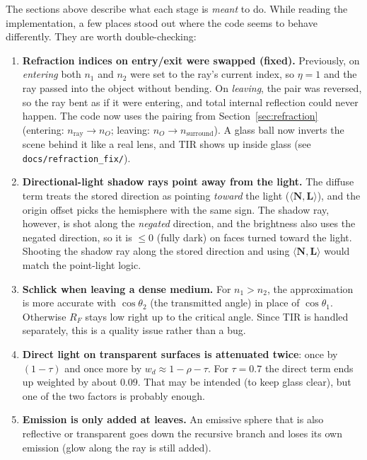 \documentclass[11pt,a4paper]{article}
\newcommand{\vv}[1]{\mathbf{#1}}
\newcommand{\dotp}[2]{\langle #1, #2\rangle}
\begin{document}
The sections above describe what each stage is \emph{meant} to do. While reading
the implementation, a few places stood out where the code seems to behave
differently. They are worth double-checking:

\begin{enumerate}[leftmargin=1.6em]
  \item \textbf{Refraction indices on entry/exit were swapped (fixed).}
        Previously, on \emph{entering} both $n_1$ and $n_2$ were set to the
        ray's current index, so $\eta=1$ and the ray passed into the object
        without bending. On \emph{leaving}, the pair was reversed, so the ray
        bent as if it were entering, and total internal reflection could never
        happen. The code now uses the pairing from Section~\ref{sec:refraction}
        (entering: $n_{\text{ray}}\to n_O$; leaving: $n_O\to n_{\text{surround}}$).
        A glass ball now inverts the scene behind it like a real lens, and TIR
        shows up inside glass (see \texttt{docs/refraction\_fix/}).
  \item \textbf{Directional-light shadow rays point away from the light.} The
        diffuse term treats the stored direction as pointing \emph{toward} the
        light ($\dotp{\vv N}{\vv L}$), and the origin offset picks the hemisphere
        with the same sign. The shadow ray, however, is shot along the
        \emph{negated} direction, and the brightness also uses the negated
        direction, so it is $\le 0$ (fully dark) on faces turned toward the
        light. Shooting the shadow ray along the stored direction and using
        $\dotp{\vv N}{\vv L}$ would match the point-light logic.
  \item \textbf{Schlick when leaving a dense medium.} For $n_1>n_2$, the
        approximation is more accurate with $\cos\theta_2$ (the transmitted
        angle) in place of $\cos\theta_1$. Otherwise $R_F$ stays low right up to
        the critical angle. Since TIR is handled separately, this is a
        quality issue rather than a bug.
  \item \textbf{Direct light on transparent surfaces is attenuated twice}: once
        by $(1-\tau)$ and once more by $w_d\approx1-\rho-\tau$. For $\tau=0.7$
        the direct term ends up weighted by about $0.09$. That may be intended
        (to keep glass clear), but one of the two factors is probably enough.
  \item \textbf{Emission is only added at leaves.} An emissive sphere that is
        also reflective or transparent goes down the recursive branch and loses
        its own emission (glow along the ray is still added).
\end{enumerate}
\end{document}
